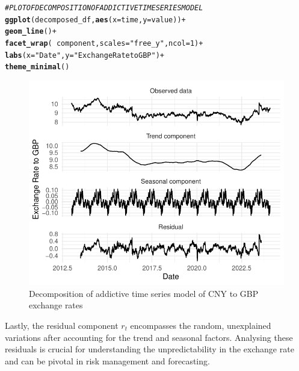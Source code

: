 \documentclass{article}\usepackage[]{graphicx}\usepackage[]{xcolor}
\makeatletter
\def\maxwidth{ %
  \ifdim\Gin@nat@width>\linewidth
    \linewidth
  \else
    \Gin@nat@width
  \fi
}
\newcommand{\hlnum}[1]{\textcolor[rgb]{0.686,0.059,0.569}{#1}}%
\newcommand{\hlstr}[1]{\textcolor[rgb]{0.192,0.494,0.8}{#1}}%
\newcommand{\hlcom}[1]{\textcolor[rgb]{0.678,0.584,0.686}{\textit{#1}}}%
\newcommand{\hlopt}[1]{\textcolor[rgb]{0,0,0}{#1}}%
\newcommand{\hlstd}[1]{\textcolor[rgb]{0.345,0.345,0.345}{#1}}%
\newcommand{\hlkwc}[1]{\textcolor[rgb]{0.333,0.667,0.333}{#1}}%
\newcommand{\hlkwd}[1]{\textcolor[rgb]{0.737,0.353,0.396}{\textbf{#1}}}%
\newenvironment{kframe}{%
 \def\at@end@of@kframe{}%
 \ifinner\ifhmode%
  \def\at@end@of@kframe{\end{minipage}}%
  \begin{minipage}{\columnwidth}%
 \fi\fi%
 \def\FrameCommand##1{\hskip\@totalleftmargin \hskip-\fboxsep
 \colorbox{shadecolor}{##1}\hskip-\fboxsep
     \hskip-\linewidth \hskip-\@totalleftmargin \hskip\columnwidth}%
 \MakeFramed {\advance\hsize-\width
   \@totalleftmargin\z@ \linewidth\hsize
   \@setminipage}}%
 {\par\unskip\endMakeFramed%
 \at@end@of@kframe}
\newenvironment{knitrout}{}{} %
\numberwithin{equation}{section}
\makeatother
\begin{document}
\begin{knitrout}\scriptsize
{}\color{fgcolor}\begin{kframe}
\begin{alltt}
\hlcom{# PLOT OF DECOMPOSITION OF ADDICTIVE TIME SERIES MODEL}
\hlkwd{ggplot}\hlstd{(decomposed_df,} \hlkwd{aes}\hlstd{(}\hlkwc{x} \hlstd{= time,} \hlkwc{y} \hlstd{= value))} \hlopt{+}
  \hlkwd{geom_line}\hlstd{()} \hlopt{+}
  \hlkwd{facet_wrap}\hlstd{(}\hlopt{~}\hlstd{component,} \hlkwc{scales} \hlstd{=} \hlstr{"free_y"}\hlstd{,} \hlkwc{ncol} \hlstd{=} \hlnum{1}\hlstd{)} \hlopt{+}
  \hlkwd{labs}\hlstd{(}\hlkwc{x} \hlstd{=} \hlstr{"Date"}\hlstd{,}\hlkwc{y} \hlstd{=} \hlstr{"Exchange Rate to GBP"}\hlstd{)} \hlopt{+}
  \hlkwd{theme_minimal}\hlstd{()}
\end{alltt}
\end{kframe}\begin{figure}[H]

{\centering \includegraphics[width=\maxwidth]{figure/beamer-decomposition_of_time_series-1} 

}

\caption[Decomposition of addictive time series model of CNY to GBP exchange rates]{Decomposition of addictive time series model of CNY to GBP exchange rates}\label{fig:decomposition of time series}
\end{figure}

\end{knitrout}

\noindent
Lastly, the residual component $r_t$ encompasses the random, unexplained variations after accounting for the trend and seasonal factors. Analysing these residuals is crucial for understanding the unpredictability in the exchange rate and can be pivotal in risk management and forecasting.
\end{document}
